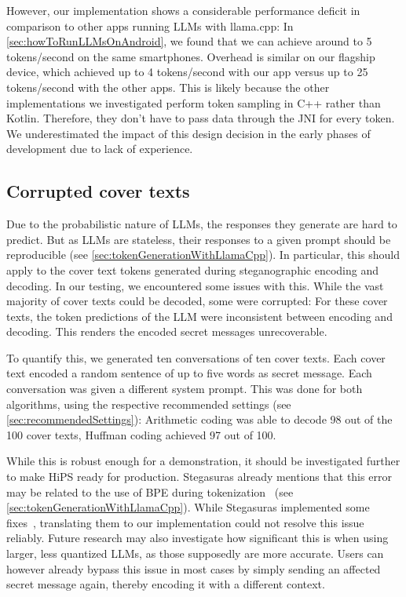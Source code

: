 However, our implementation shows a considerable performance deficit in comparison to other apps running \glspl{LLM} with llama.cpp: In \cref{sec:howToRunLLMsOnAndroid}, we found that we can achieve around to 5 tokens/second on the same smartphones. Overhead is similar on our flagship device, which achieved up to 4 tokens/second with our app versus up to 25 tokens/second with the other apps. This is likely because the other implementations we investigated perform token sampling in C++ rather than Kotlin. Therefore, they don't have to pass data through the \gls{JNI} for every token. We underestimated the impact of this design decision in the early phases of development due to lack of experience.

\subsection{Corrupted cover texts}
\label{sec:corruptedCoverTexts}
Due to the probabilistic nature of \glspl{LLM}, the responses they generate are hard to predict. But as \glspl{LLM} are stateless, their responses to a given prompt should be reproducible (see \cref{sec:tokenGenerationWithLlamaCpp}). In particular, this should apply to the cover text tokens generated during steganographic encoding and decoding. In our testing, we encountered some issues with this. While the vast majority of cover texts could be decoded, some were corrupted: For these cover texts, the token predictions of the \gls{LLM} were inconsistent between encoding and decoding. This renders the encoded secret messages unrecoverable.

To quantify this, we generated ten conversations of ten cover texts. Each cover text encoded a random sentence of up to five words as secret message. Each conversation was given a different system prompt. This was done for both algorithms, using the respective recommended settings (see \cref{sec:recommendedSettings}): Arithmetic coding was able to decode 98 out of the 100 cover texts, Huffman coding achieved 97 out of 100.

While this is robust enough for a demonstration, it should be investigated further to make \gls{HiPS} ready for production. Stegasuras already mentions that this error may be related to the use of \gls{BPE} during tokenization~\cite{zieglerStegasuras2025,zieglerHarvardnlpNeuralSteganography2025} (see \cref{sec:tokenGenerationWithLlamaCpp}). While Stegasuras implemented some fixes~\cite{zieglerHarvardnlpNeuralSteganography2025}, translating them to our implementation could not resolve this issue reliably. Future research may also investigate how significant this is when using larger, less quantized \glspl{LLM}, as those supposedly are more accurate. Users can however already bypass this issue in most cases by simply sending an affected secret message again, thereby encoding it with a different context.

